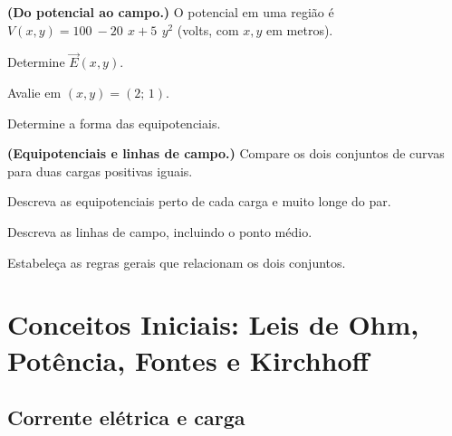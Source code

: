 \begin{questao}[4]{}

\textbf{(Do potencial ao campo.)} O potencial em uma região é
$V(x,y)=\SI{100}{}-\SI{20}{}\,x+\SI{5}{}\,y^{2}$ (volts, com $x,y$ em metros).
\begin{itensq}
\item Determine $\vec E(x,y)$.
\item Avalie em $(x,y)=(2;\,1)$.
\item Determine a forma das equipotenciais.
\end{itensq}


\end{questao}
\begin{questao}[4]{}

\textbf{(Equipotenciais e linhas de campo.)} Compare os dois conjuntos de
curvas para duas cargas positivas iguais.
\begin{itensq}
\item Descreva as equipotenciais perto de cada carga e muito longe do par.
\item Descreva as linhas de campo, incluindo o ponto médio.
\item Estabeleça as regras gerais que relacionam os dois conjuntos.
\end{itensq}


\end{questao}


\section{Conceitos Iniciais: Leis de Ohm, Potência, Fontes e Kirchhoff}

\subsection{Corrente elétrica e carga}

